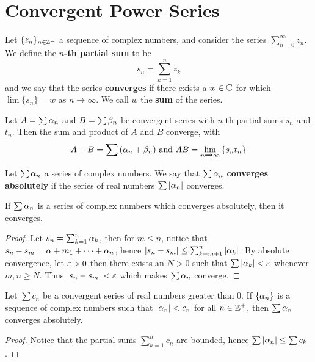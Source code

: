 \section{Convergent Power Series}

\begin{definition}
    Let $\{z_n\}_{n \in \mathbb{Z}^+}$ a sequence of complex numbers, and consider the
    series $\sum_{n=0}^\infty{z_n}$. We define the \textbf{$n$-th partial sum}
    to be
    \begin{equation*}
        s_n=\sum_{k=1}^n{z_k}
    \end{equation*}
    and we say that the series \textbf{converges} if there exists a $w \in \mathbb{C}$
    for which  $\lim{\{s_n\}}=w$ as $n \xrightarrow{} \infty$. We call $w$ the
    \textbf{sum} of the series.
\end{definition}

\begin{lemma}\label{lemma_2.2.1}
    Let $A=\sum{\alpha_n}$ and $B=\sum{\beta_n}$ be convergent series with $n$-th
    partial sums  $s_n$ and  $t_n$. Then the sum and product of  $A$ and  $B$
    converge, with
    \begin{equation*}
        A+B=\sum{(\alpha_n+\beta_n)} \text{ and } AB=\lim_{n \xrightarrow{} \infty}{\{s_nt_n\}}
    \end{equation*}
\end{lemma}

\begin{definition}
    Let $\sum{\alpha_n}$ a series of complex numbers. We say that $\sum{\alpha_n}$
    \textbf{converges absolutely} if the series of real numbers $\sum{|\alpha_n|}$
    converges.
\end{definition}

\begin{lemma}\label{2.2.2}
    If $\sum{\alpha_n}$ is a series of complex numbers which converges absolutely,
    then it converges.
\end{lemma}
\begin{proof}
    Let $s_n=\sum_{k=1}^n{\alpha_k}$, then for $m \leq n$, notice that
    $s_n-s_m=\alpha+{m_1}+\dots+\alpha_n$, hence $|s_n-s_m| \leq
    \sum_{k=m+1}^n{|\alpha_k|}$. By absolute convergence, let $\varepsilon>0$ then there
    exists an  $N>0$ such that  $\sum{|\alpha_k|}<\varepsilon$ whenever $m,n \geq N$. Thus
    $|s_n-s_m|<\varepsilon$ which makes  $\sum{\alpha_n}$ converge.
\end{proof}

\begin{lemma}\label{2.2.3}
    Let $\sum{c_n}$ be a convergent series of real numbers greater than $0$. If
    $\{\alpha_n\}$ is a sequence of complex numbers such that $|\alpha_n|<c_n$ for all
    $n \in \mathbb{Z}^+$, then  $\sum{\alpha_n}$ converges absolutely.
\end{lemma}
\begin{proof}
    Notice that the partial sums $\sum_{k=1}^n{c_n}$ are bounded, hence
    $\sum{|\alpha_n|} \leq \sum{c_k}$.
\end{proof}

